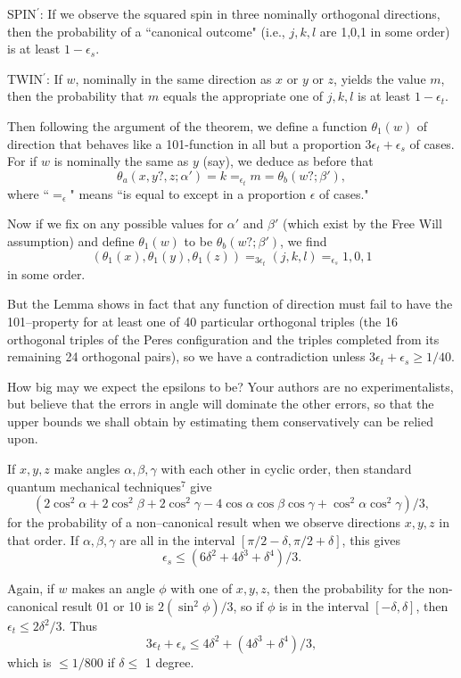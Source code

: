 \documentclass[12pt]{amsart}
\begin{document}
SPIN$^\prime$: If we observe the squared spin in three nominally 
orthogonal directions, then the probability of a ``canonical outcome" 
(i.e., $j,k,l$ are 1,0,1 in some order) is
at least $1 - \epsilon_s$.

TWIN$^\prime$: If $w$, nominally in the same direction as 
$x$ or $y$ or $z$, yields the value $m$, then the probability that 
$m$ equals the appropriate one of $j,k,l$
is at least $1 - \epsilon_t$.

Then following the argument of the theorem, we define a function $\theta_1(w)$ of direction that behaves like a 101-function in all but a proportion $3\epsilon_t + \epsilon_s$ of cases. For if $w$ is nominally the same as $y$ 
(say), we deduce as before that $$\theta_a(x,y?,z;\alpha') 
= k =_{\epsilon_t}m= \theta_b(w?;\beta'),$$
where ``$=_{\epsilon}$" means ``is equal to except in a 
proportion $\epsilon$ of cases."

Now if we fix on any possible values for $\alpha'$ and $\beta'$ (which exist by
the Free Will assumption) and define $\theta_1(w)$ to be $\theta_b(w?;\beta')$, 
we find 
$$(\theta_1(x),\theta_1(y),\theta_1(z)) 
   =_{3\epsilon_t}(j,k,l) =_{\epsilon_s} 1,0,1$$
in some order.  

But the Lemma shows in fact 
that any function of direction must fail to have the 101--property 
for at least one of 40 particular orthogonal triples 
(the 16 orthogonal triples of the Peres configuration and the
 triples completed from its remaining 24 orthogonal pairs), 
so we have a contradiction unless 
$3\epsilon_t + \epsilon_s \ge 1/40.$

How big may we expect the epsilons to be? Your authors are no experimentalists,
but believe that the errors in angle will dominate the other errors, so that the upper bounds we shall obtain by estimating them conservatively can be relied upon.

If  $x,y,z$ make
angles $\alpha, \beta, \gamma$ with each other in cyclic order, then standard quantum 
mechanical techniques$^7$ give 
$$
(2\cos^2\alpha + 2 \cos^2\beta + 2 \cos^2\gamma - 
   4 \cos\alpha \cos\beta \cos \gamma + \cos^2\alpha \cos^2\gamma)/3,
$$
for the probability of a non--canonical result when we observe 
directions $x,y,z$ in that
order.  If $\alpha,\beta,\gamma$ are all in the interval 
$[\pi/2 - \delta, \pi/2 + \delta]$, this gives 
$$ 
\epsilon_s \le (6\delta^2 + 4\delta^3 + \delta^4)/3.
$$
  
Again, if $w$ makes an angle $\phi$ with one of $x,y,z$, 
then the probability
for the non-canonical result 01 or 10 is $2(\sin^2\phi)/3$, 
so if $\phi$ is in the interval $[-\delta,\delta]$, 
then $\epsilon_t \le 2\delta^2/3$.  Thus
$$
3\epsilon_t + \epsilon_s \le 4\delta^2 + 
(4\delta^3 + \delta^4)/3,$$
which is $\le 1/800$ if $\delta \le$ 1 degree.  
 
\end{document}
